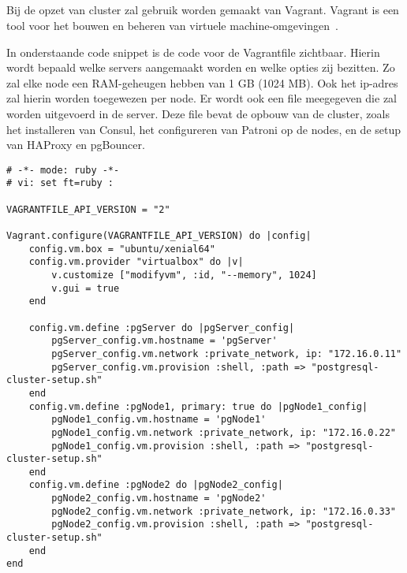 \subsection{}
\label{subsec:Vagrant}
Bij de opzet van cluster zal gebruik worden gemaakt van Vagrant. Vagrant is een tool voor het bouwen en beheren van virtuele machine-omgevingen~\autocite{Kalow2020}.



In onderstaande code snippet is de code voor de Vagrantfile zichtbaar. Hierin wordt bepaald welke servers aangemaakt worden en welke opties zij bezitten. Zo zal elke node een RAM-geheugen hebben van 1 GB (1024 MB). Ook het ip-adres zal hierin worden toegewezen per node. Er wordt ook een file meegegeven die zal worden uitgevoerd in de server. Deze file bevat de opbouw van de cluster, zoals het installeren van Consul, het configureren van Patroni op de nodes, en de setup van HAProxy en pgBouncer.

\begin{lstlisting}
# -*- mode: ruby -*-
# vi: set ft=ruby :

VAGRANTFILE_API_VERSION = "2"

Vagrant.configure(VAGRANTFILE_API_VERSION) do |config|
    config.vm.box = "ubuntu/xenial64"
    config.vm.provider "virtualbox" do |v|
        v.customize ["modifyvm", :id, "--memory", 1024]
        v.gui = true
    end

    config.vm.define :pgServer do |pgServer_config|
        pgServer_config.vm.hostname = 'pgServer'
        pgServer_config.vm.network :private_network, ip: "172.16.0.11"
        pgServer_config.vm.provision :shell, :path => "postgresql-cluster-setup.sh"
    end
    config.vm.define :pgNode1, primary: true do |pgNode1_config|
        pgNode1_config.vm.hostname = 'pgNode1'
        pgNode1_config.vm.network :private_network, ip: "172.16.0.22"
        pgNode1_config.vm.provision :shell, :path => "postgresql-cluster-setup.sh"
    end
    config.vm.define :pgNode2 do |pgNode2_config|
        pgNode2_config.vm.hostname = 'pgNode2'
        pgNode2_config.vm.network :private_network, ip: "172.16.0.33"
        pgNode2_config.vm.provision :shell, :path => "postgresql-cluster-setup.sh"
    end
end
\end{lstlisting}

